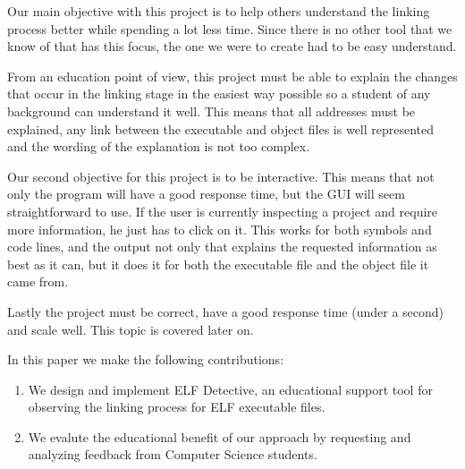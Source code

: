 Our main objective with this project is to help others understand the linking process better while spending a lot less time. Since there is no other tool that we know of that has this focus, the one we were to create had to be easy understand.

From an education point of view, this project must be able to explain the changes that occur in the linking stage in the easiest way possible so a student of any background can understand it well. This means that all addresses must be explained, any link between the executable and object files is well represented and the wording of the explanation is not too complex.

Our second objective for this project is to be interactive. This means that not only the program will have a good response time, but the GUI will seem straightforward to use. If the user is currently inspecting a project and require more information, he just has to click on it. This works for both symbols and code lines, and the output not only that explains the requested information as best as it can, but it does it for both the executable file and the object file it came from.

Lastly the project must be correct, have a good response time (under a second) and scale well. This topic is covered later on.

In this paper we make the following contributions:
\begin{enumerate}
  \item We design and implement ELF Detective, an educational support tool for observing the linking process for ELF executable files.
  \item We evalute the educational benefit of our approach by requesting and analyzing feedback from Computer Science students.
\end{enumerate}
